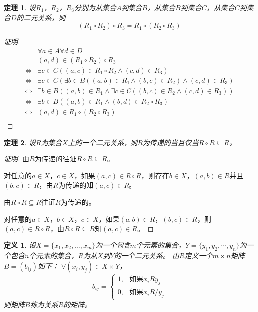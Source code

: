 \documentclass{article}
\newtheorem{Def}{定义}
\newtheorem{Thm}{定理}
\begin{document}
\begin{CJK*}{UTF8}{gbsn}
    \begin{Thm}
    设$R_1$，$R_2$，$R_3$分别为从集合$A$到集合$B$，从集合$B$到集合$C$，从集合$C$到集合$D$的二元关系，则
    \[(R_1 \circ R_2)\circ R_3 = R_1 \circ (R_2 \circ R_3)\]
  \end{Thm}
  \begin{proof}[证明]
  \begin{align*}
    &\forall a\in A\forall d\in D\\
    &(a,d)\in (R_1\circ R_2)\circ R_3\\
    \Leftrightarrow&\exists c\in C((a,c)\in R_1\circ R_2 \land (c,d)\in R_3)\\
   \Leftrightarrow&\exists c\in C(\exists b\in B ((a,b)\in R_1 \land (b,c)\in R_2) \land (c,d)\in R_3)\\
   \Leftrightarrow&\exists b\in B( (a,b)\in R_1 \land \exists c\in C ((b,c)\in R_2 \land (c,d)\in R_3))\\
   \Leftrightarrow&\exists b\in B( (a,b)\in R_1 \land (b,d)\in R_2\circ R_3)\\
   \Leftrightarrow&(a,d)\in R_1 \circ (R_2 \circ R_3)\\
  \end{align*}
  \end{proof}

  \begin{Thm}
    设$R$为集合$X$上的一个二元关系，则$R$为传递的当且仅当$R\circ R \subseteq R$。
  \end{Thm}
  \begin{proof}[证明]
    由$R$为传递的往证$R\circ R\subseteq R$。

    对任意的$a\in X$，$c\in X$，如果$(a,c)\in R\circ R$，则存在$b\in X$，$(a,b)\in R$并且$(b,c)\in R$，由$R$为传递的知$(a,c)\in R$。

    由$R\circ R\subseteq R$往证$R$为传递的。

    对任意的$a\in X$，$b\in X$，$c\in X$，如果$(a,b)\in R$，$(b,c)\in R$，则$(a,c)\in R\circ R$，由$R\circ R\subseteq R$知$(a,c)\in R$。
  \end{proof}
   \begin{Def}
    设$X=\{x_1, x_2, \ldots, x_m\}$为一个包含$m$个元素的集合，$Y=\{y_1, y_2,
    \cdots, y_n\}$为一个包含$n$个元素的集合，$R$为从$X$到$Y$的一个二元关系。
    由$R$定义一个$m \times n$矩阵$B = (b_{ij})$如下： $\forall (x_i, y_j) \in X \times Y$，
\[
    b_{ij}=
      \begin{cases}
        1,&\text{如果}x_iRy_j\\
        0,&\text{如果}x_iR\!\!\! / y_j
      \end{cases}
\]
    则矩阵$B$称为关系$R$的矩阵。
  \end{Def}


\end{CJK*}
\end{document}
